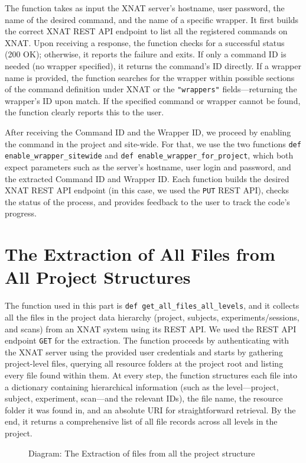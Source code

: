 The function takes as input the XNAT server’s hostname, user password, the name of the desired command, and the name of a specific wrapper. It first builds the correct XNAT REST API endpoint to list all the registered commands on XNAT.
Upon receiving a response, the function checks for a successful status (200 OK); otherwise, it reports the failure and exits. If only a command ID is needed (no wrapper specified), it returns the command’s ID directly. If a wrapper name is provided, the function searches for the wrapper within possible sections of the command definition under XNAT or the \texttt{"wrappers"} fields—returning the wrapper’s ID upon match. If the specified command or wrapper cannot be found, the function clearly reports this to the user.

After receiving the Command ID and the Wrapper ID, we proceed by enabling the command in the project and site-wide. For that, we use the two functions \texttt{def enable\_wrapper\_sitewide} and \texttt{def enable\_wrapper\_for\_project}, which both expect parameters such as the server’s hostname, user login and password, and the extracted Command ID and Wrapper ID. Each function builds the desired XNAT REST API endpoint (in this case, we used the \texttt{PUT} REST API), checks the status of the process, and provides feedback to the user to track the code’s progress.

\section{The Extraction of All Files from All Project Structures}

The function used in this part is \texttt{def get\_all\_files\_all\_levels}, and it collects all the files in the project data hierarchy (project, subjects, experiments/sessions, and scans) from an XNAT system using its REST API. We used the REST API endpoint \texttt{GET} for the extraction. The function proceeds by authenticating with the XNAT server using the provided user credentials and starts by gathering project-level files, querying all resource folders at the project root and listing every file found within them. At every step, the function structures each file into a dictionary containing hierarchical information (such as the level—project, subject, experiment, scan—and the relevant IDs), the file name, the resource folder it was found in, and an absolute URI for straightforward retrieval. By the end, it returns a comprehensive list of all file records across all levels in the project.
\begin{figure}[ht]
    \centering
    \def\svgwidth{0.9\linewidth}
    
    \caption{Diagram: The Extraction of files from all the project structure}
    \label{fig:enter-label}
\end{figure}

